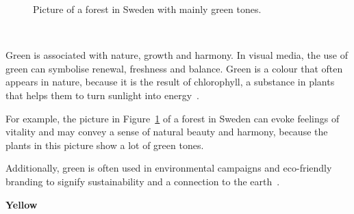 \documentclass[../MasterThesis.tex]{subfiles}
\begin{document}
%
%
\begin{minipage}{0.5\textwidth}
	\begin{figure}[H]
		\begin{center}
			\caption[Picture of a forest in Sweden with mainly green tones.]{Picture of a forest in Sweden with mainly green tones.}
			\label{figure:green}
		\end{center}
	\end{figure}\hfill
\end{minipage}\begin{minipage}{0.05\textwidth}
	\ 
\end{minipage}\begin{minipage}{0.45\textwidth}
	Green is associated with nature, growth and harmony. In visual media, the use of green can symbolise renewal, freshness and balance. Green is a colour that often appears in nature, because it is the result of chlorophyll, a substance in plants that helps them to turn sunlight into energy~\cite{green, colour2}.
	
	For example, the picture in Figure~\ref{figure:green} of a forest in Sweden can evoke feelings of vitality and may convey a sense of natural beauty and harmony, because the plants in this picture show a lot of green tones.
	

	
	
\end{minipage}

	
	\vspace*{-0.2em}

	Additionally, green is often used in environmental campaigns and eco-friendly branding to signify sustainability and a connection to the earth~\cite{greenwashing}. 








\newpage
\textbf{\textcolor{YellowOrange}{Yellow}}
\end{document}
